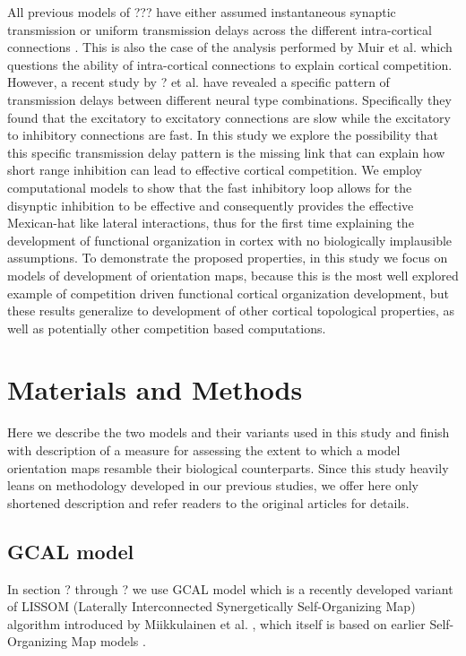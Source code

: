 \documentclass[a4paper,10pt]{article}
\begin{document}
All previous models of ??? have either assumed instantaneous synaptic transmission \cite{?,?} or uniform transmission delays
across the different intra-cortical connections \cite{?,?}. This is also the case of the analysis performed by Muir et al. \cite{?}
which questions the ability of intra-cortical connections to explain cortical competition. However, a recent study by ? et al. \cite{?}
have revealed a specific pattern of transmission delays between different neural type combinations. Specifically they found that the
excitatory to excitatory connections are slow while the excitatory to inhibitory connections are fast. In this study we explore the 
possibility that this specific transmission delay pattern is the missing link that can explain how short range inhibition can lead 
to effective cortical competition. We employ computational models to show that the fast inhibitory loop allows for the disynptic
inhibition to be effective and consequently provides the effective Mexican-hat like lateral interactions, thus for the first time 
explaining the development of functional organization in cortex with no biologically implausible assumptions. To demonstrate the
proposed properties, in this study we focus on models of development of orientation maps, because this is the most well explored
example of competition driven functional cortical organization development, but these results generalize to development of other
cortical topological properties, as well as potentially other competition based computations.


\section{Materials and Methods}

Here we describe the two models and their variants used in this study and finish with description of a measure
for assessing the extent to which a model orientation maps resamble their biological counterparts. Since this study heavily leans on methodology 
developed in our previous studies, we offer here only shortened description and refer readers to the original articles for details.

\subsection{GCAL model}

In section ? through ? we use GCAL model \cite{Stevens2013}  which is a recently developed variant of LISSOM 
(Laterally Interconnected Synergetically Self-Organizing Map) algorithm introduced by Miikkulainen et al. \cite{CMVC}, 
which itself is based on earlier Self-Organizing Map models \cite{Kohonen1982}.
\end{document}
